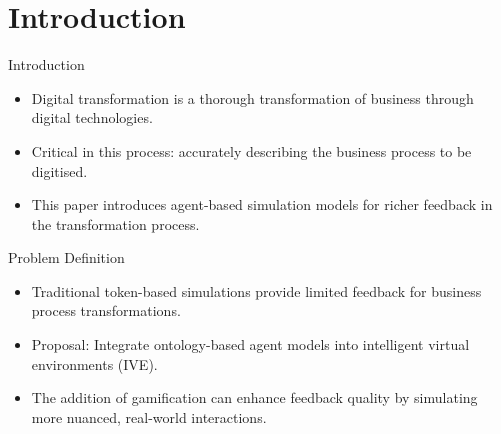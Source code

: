 \section{Introduction}

\begin{frame}{Introduction}
    \begin{itemize}
        \item \alert{Digital transformation} is a thorough transformation of business through digital technologies.
        \item Critical in this process: accurately describing the business process to be digitised.
        \item This paper introduces agent-based simulation models for richer feedback in the transformation process.
    \end{itemize}
\end{frame}

\begin{frame}{Problem Definition}
    \begin{itemize}
        \item Traditional token-based simulations provide limited feedback for business process transformations.
        \item Proposal: Integrate ontology-based agent models into intelligent virtual environments (IVE).
        \item The addition of gamification can enhance feedback quality by simulating more nuanced, real-world interactions.
    \end{itemize}
\end{frame}

